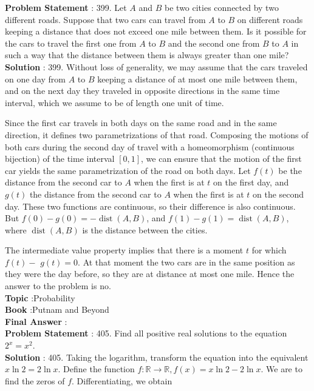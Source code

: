 \documentclass[10pt]{article}
\begin{document}
\textbf{Problem Statement} :
399. Let $A$ and $B$ be two cities connected by two different roads. Suppose that two cars can travel from $A$ to $B$ on different roads keeping a distance that does not exceed one mile between them. Is it possible for the cars to travel the first one from $A$ to $B$ and the second one from $B$ to $A$ in such a way that the distance between them is always greater than one mile?
\\
\textbf{Solution} :
399. Without loss of generality, we may assume that the cars traveled on one day from $A$ to $B$ keeping a distance of at most one mile between them, and on the next day they traveled in opposite directions in the same time interval, which we assume to be of length one unit of time.

Since the first car travels in both days on the same road and in the same direction, it defines two parametrizations of that road. Composing the motions of both cars during the second day of travel with a homeomorphism (continuous bijection) of the time interval $[0,1]$, we can ensure that the motion of the first car yields the same parametrization of the road on both days. Let $f(t)$ be the distance from the second car to $A$ when the first is at $t$ on the first day, and $g(t)$ the distance from the second car to $A$ when the first is at $t$ on the second day. These two functions are continuous, so their difference is also continuous. But $f(0)-g(0)=-\operatorname{dist}(A, B)$, and $f(1)-g(1)=\operatorname{dist}(A, B)$, where $\operatorname{dist}(A, B)$ is the distance between the cities.

The intermediate value property implies that there is a moment $t$ for which $f(t)-$ $g(t)=0$. At that moment the two cars are in the same position as they were the day before, so they are at distance at most one mile. Hence the answer to the problem is no. 
\\
\textbf{Topic} :Probability\\
\textbf{Book} :Putnam and Beyond\\
\textbf{Final Answer} :\\


\textbf{Problem Statement} :
405. Find all positive real solutions to the equation $2^{x}=x^{2}$.
\\
\textbf{Solution} :
405. Taking the logarithm, transform the equation into the equivalent $x \ln 2=2 \ln x$. Define the function $f: \mathbb{R} \rightarrow \mathbb{R}, f(x)=x \ln 2-2 \ln x$. We are to find the zeros of $f$. Differentiating, we obtain
\end{document}
